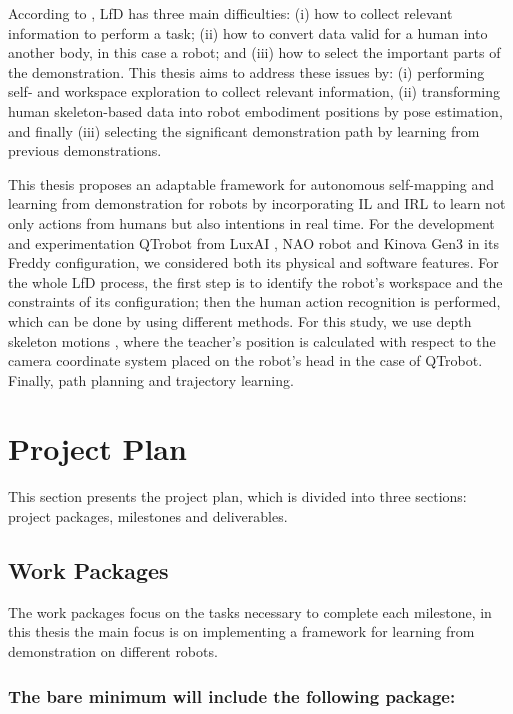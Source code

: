 \documentclass[thesis]{mas_proposal}
\begin{document}
	According to \cite{Lopes2005}, LfD has three main difficulties: (i) how to collect relevant information to perform a task; (ii) how to convert data valid for a human into another body, in this case a robot; and (iii) how to select the important parts of the demonstration. This thesis aims to address these issues by: (i) performing self- and workspace exploration to collect relevant information, (ii) transforming human skeleton-based data into robot embodiment positions by pose estimation, and finally (iii) selecting the significant demonstration path by learning from previous demonstrations.
	
	This thesis proposes an adaptable framework for autonomous self-mapping and learning from demonstration for robots by incorporating IL and IRL to learn not only actions from humans but also intentions in real time. For the development and experimentation QTrobot from LuxAI \cite{qtrobot_safety_manual}, NAO robot and Kinova Gen3 in its Freddy configuration, we considered both its physical and software features. For the whole LfD process, the first step is to identify the robot's workspace and the constraints of its configuration; then the human action recognition is performed, which can be done by using different methods. For this study, we use depth skeleton motions \cite{Chen2016}, where the teacher's position is calculated with respect to the camera coordinate system placed on the robot's head in the case of QTrobot. Finally, path planning and trajectory learning.
   
\section{Project Plan}

	This section presents the project plan, which is divided into three sections: project packages, milestones and deliverables.

	\subsection{Work Packages}
	
	The work packages focus on the tasks necessary to complete each milestone, in this thesis the main focus is on implementing a framework for learning from demonstration on different robots.
	
	\subsubsection{The bare minimum will include the following package:}
\end{document}
